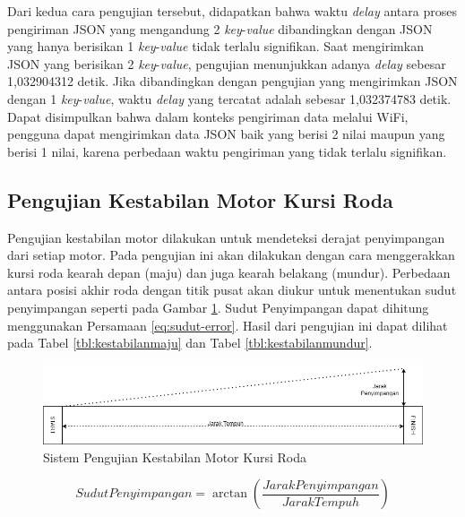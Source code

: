Dari kedua cara pengujian tersebut, didapatkan bahwa waktu \emph{delay} antara proses pengiriman JSON yang mengandung 2 \emph{key}-\emph{value} dibandingkan dengan JSON yang hanya berisikan 1 \emph{key}-\emph{value} tidak terlalu signifikan. Saat mengirimkan JSON yang berisikan 2 \emph{key}-\emph{value}, pengujian menunjukkan adanya \emph{delay} sebesar 1,032904312 detik. Jika dibandingkan dengan pengujian yang mengirimkan JSON dengan 1 \emph{key}-\emph{value}, waktu \emph{delay} yang tercatat adalah sebesar 1,032374783 detik. Dapat disimpulkan bahwa dalam konteks pengiriman data melalui WiFi, pengguna dapat mengirimkan data JSON baik yang berisi 2 nilai maupun yang berisi 1 nilai, karena perbedaan waktu pengiriman yang tidak terlalu signifikan.

\subsection{Pengujian Kestabilan Motor Kursi Roda}

Pengujian kestabilan motor dilakukan untuk mendeteksi derajat penyimpangan dari setiap motor. Pada pengujian ini akan dilakukan dengan cara menggerakkan kursi roda kearah depan (maju) dan juga kearah belakang (mundur). Perbedaan antara posisi akhir roda dengan titik pusat akan diukur untuk menentukan sudut penyimpangan seperti pada Gambar \ref{fig:PengujianKestabilanMotor}. Sudut Penyimpangan dapat dihitung menggunakan Persamaan \ref{eq:sudut-error}. Hasil dari pengujian ini dapat dilihat pada Tabel \ref{tbl:kestabilanmaju} dan Tabel \ref{tbl:kestabilanmundur}.

\begin{figure} [ht] \centering
  \includegraphics[scale=0.55]{gambar/program/Sudut Penyimpangan.png}
  \caption{Sistem Pengujian Kestabilan Motor Kursi Roda}
  \label{fig:PengujianKestabilanMotor}
\end{figure}

\begin{equation}
  \label{eq:sudut-error}
  Sudut Penyimpangan = \arctan \left ( \frac{Jarak Penyimpangan}{Jarak Tempuh} \right )
\end{equation}

